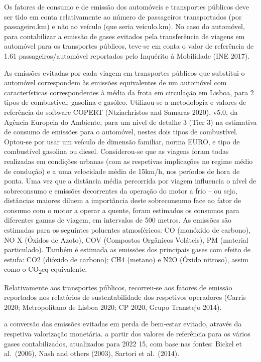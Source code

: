 \documentclass[runningheads]{llncs}
\begin{document}
Os fatores de consumo e de emissão dos automóveis e transportes públicos
deve ser tido em conta relativamente ao número de passageiros
transportados (por passageiro.km) e não ao veículo (que seria
veículo.km). No caso do automóvel, para contabilizar a emissão de gases
evitados pela transferência de viagens em automóvel para os transportes
públicos, teve-se em conta o valor de referência de 1.61
passageiros/automóvel reportados pelo Inquérito à Mobilidade (INE 2017).

As emissões evitadas por cada viagem em transportes públicos que
substitui o automóvel correspondem às emissões equivalentes de um
automóvel com características correspondentes à média da frota em
circulação em Lisboa, para 2 tipos de combustível: gasolina e gasóleo.
Utilizou-se a metodologia e valores de referência do software COPERT
(Ntziachristos and Samaras 2020), v5.0, da Agência Europeia do Ambiente,
para um nível de detalhe 3 (Tier 3) na estimativa de consumo de emissões
para o automóvel, nestes dois tipos de combustível. Optou-se por usar um
veículo de dimensão familiar, norma EURO, e tipo de combustível gasolina
ou diesel. Considerou-se que as viagens foram todas realizadas em
condições urbanas (com as respetivas implicações no regime médio de
condução) e a uma velocidade média de 15km/h, nos períodos de hora de
ponta. Uma vez que a distância média percorrida por viagem influencia o
nível de sobreconsumo e emissões decorrentes da operação do motor a frio
-- ou seja, distâncias maiores diluem a importância deste sobreconsumo
face ao fator de consumo com o motor a operar a quente, foram estimados
os consumos para diferentes gamas de viagem, em intervalos de 500
metros. As emissões são estimadas para os seguintes poluentes
atmosféricos: CO (monóxido de carbono), NO X (Óxidos de Azoto), COV
(Compostos Orgânicos Voláteis), PM (material particulado). Também é
estimada as emissões dos principais gases com efeito de estufa: CO2
(dióxido de carbono); CH4 (metano) e N2O (Óxido nitroso), assim como o
CO\textsubscript{2}eq equivalente.

Relativamente aos transportes públicos, recorreu-se aos fatores de
emissão reportados nos relatórios de sustentabilidade dos respetivos
operadores (Carris 2020; Metropolitano de Lisboa 2020; CP 2020, Grupo
Transtejo 2014).

a conversão das emissões evitadas em perda de bem-estar evitado, através
da respetiva valorização monetária. a partir dos valores de referência
para os vários gases contabilizados, atualizados para 2022 15, com base
nas fontes: Bickel et al.~(2006), Nash and others (2003), Sartori et
al.~(2014).
\end{document}
